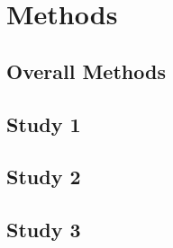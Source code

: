 \section{Methods}
\subsection{Overall Methods}

\subsection{Study 1}

\subsection{Study 2}

\subsection{Study 3}